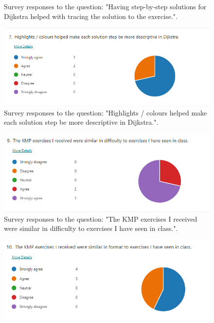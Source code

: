 \documentclass{l4proj}
\begin{document}
\begin{appendices}
\begin{figure}[h]
    \caption{Survey responses to the question: "Having step-by-step solutions for Dijkstra helped with tracing the solution to the exercise.".}
    \label{fig:d_step_by_step} 
\end{figure}

\begin{figure}[h]
    \centering
    \includegraphics[width=0.9\linewidth]{images/d_highlights.png}    

    \caption{Survey responses to the question: "Highlights / colours helped make each solution step be more descriptive in Dijkstra.".}
    \label{fig:d_highlights} 
\end{figure}

\begin{figure}[h]
    \centering
    \includegraphics[width=0.9\linewidth]{images/k_similar_difficulty.png}    

    \caption{Survey responses to the question: "The KMP exercises I received were similar in difficulty to exercises I have seen in class.".}
    \label{fig:k_similar_difficulty} 
\end{figure}

\begin{figure}[h]
    \centering
    \includegraphics[width=0.9\linewidth]{images/k_similar_format.png}    


\end{figure}
\end{appendices}
\end{document}
